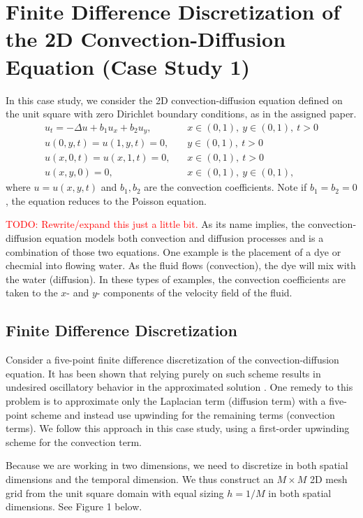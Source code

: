 \documentclass[12pt, letterpaper]{article}
\newcommand\todo[1]{\textcolor{red}{#1}}
\begin{document}
\section*{Finite Difference Discretization of the 2D Convection-Diffusion Equation (Case Study 1)}

In this case study, we consider the 2D convection-diffusion equation defined on the unit square with zero Dirichlet boundary conditions, as in the assigned paper.
\begin{align*}
u_t = -\Delta u + b_1 u_x + b_2 u_y,&~~~~x \in (0,1),~y \in (0,1),~t > 0\\
u(0,y,t) = u(1,y,t) = 0,&~~~~y \in (0,1),~t > 0\\
u(x,0,t) = u(x,1,t) = 0,&~~~~x \in (0,1),~t > 0\\
u(x,y,0) = 0,&~~~~x \in (0,1),~y \in (0,1),
\end{align*}
where $u = u(x,y,t)$ and $b_1, b_2$ are the convection coefficients. Note if $b_1 = b_2 = 0$, the equation reduces to the Poisson equation.

\todo{TODO: Rewrite/expand this just a little bit.}
As its name implies, the convection-diffusion equation models both convection and diffusion processes and is a combination of those two equations. One example is the placement of a dye or checmial into flowing water. As the fluid flows (convection), the dye will mix with the water (diffusion). In these types of examples, the convection coefficients are taken to the $x$- and $y$- components of the velocity field of the fluid.

\subsection*{Finite Difference Discretization}
Consider a five-point finite difference discretization of the convection-diffusion equation. It has been shown that relying purely on such scheme results in undesired oscillatory behavior in the approximated solution \cite{}. One remedy to this problem is to approximate only the Laplacian term (diffusion term) with a five-point scheme and instead use upwinding for the remaining terms (convection terms). We follow this approach in this case study, using a first-order upwinding scheme for the convection term.

Because we are working in two dimensions, we need to discretize in both spatial dimensions and the temporal dimension. We thus construct an $M \times M$ 2D mesh grid from the unit square domain with equal sizing $h = 1/M$ in both spatial dimensions. See Figure 1 below.
\end{document}

